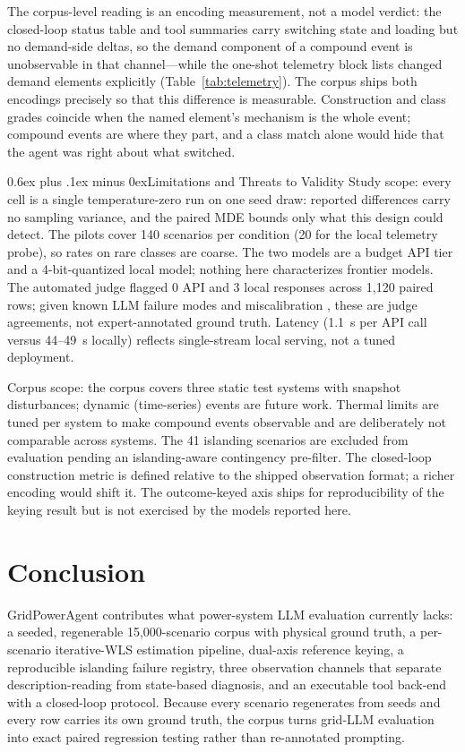 \documentclass[conference]{IEEEtran}
\makeatletter
\def\subsection{\@startsection{subsection}{2}{\z@}{1.2ex plus 0.2ex minus 0.1ex}%
{0.6ex plus .1ex minus 0ex}{\normalfont\normalsize\itshape}}%
\makeatother
\begin{document}
The corpus-level reading is an encoding measurement, not a model verdict: the closed-loop status table and tool summaries carry switching state and loading but no demand-side deltas, so the demand component of a compound event is unobservable in that channel---while the one-shot telemetry block lists changed demand elements explicitly (Table~\ref{tab:telemetry}). The corpus ships both encodings precisely so that this difference is measurable. Construction and class grades coincide when the named element's mechanism is the whole event; compound events are where they part, and a class match alone would hide that the agent was right about what switched.

\subsection{Limitations and Threats to Validity}
Study scope: every cell is a single temperature-zero run on one seed draw: reported differences carry no sampling variance, and the paired MDE bounds only what this design could detect. The pilots cover 140 scenarios per condition (20 for the local telemetry probe), so rates on rare classes are coarse. The two models are a budget API tier and a 4-bit-quantized local model; nothing here characterizes frontier models. The automated judge flagged 0 API and 3 local responses across 1,120 paired rows; given known LLM failure modes \cite{ji2023surveyhalluc} and miscalibration \cite{guo2017calibration}, these are judge agreements, not expert-annotated ground truth. Latency (1.1~s per API call versus 44--49~s locally) reflects single-stream local serving, not a tuned deployment.

Corpus scope: the corpus covers three static test systems with snapshot disturbances; dynamic (time-series) events are future work. Thermal limits are tuned per system to make compound events observable and are deliberately not comparable across systems. The 41 islanding scenarios are excluded from evaluation pending an islanding-aware contingency pre-filter. The closed-loop construction metric is defined relative to the shipped observation format; a richer encoding would shift it. The outcome-keyed axis ships for reproducibility of the keying result but is not exercised by the models reported here.

\section{Conclusion}
GridPowerAgent contributes what power-system LLM evaluation currently lacks: a seeded, regenerable 15,000-scenario corpus with physical ground truth, a per-scenario iterative-WLS estimation pipeline, dual-axis reference keying, a reproducible islanding failure registry, three observation channels that separate description-reading from state-based diagnosis, and an executable tool back-end with a closed-loop protocol. Because every scenario regenerates from seeds and every row carries its own ground truth, the corpus turns grid-LLM evaluation into exact paired regression testing rather than re-annotated prompting.
\end{document}
